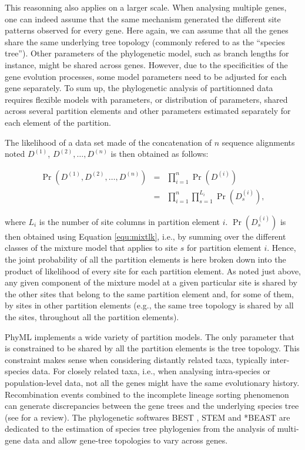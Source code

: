 \documentclass[a4paper,12pt]{article}
\begin{document}
This reasonning  also applies on a  larger scale. When  analysing multiple genes, one  can indeed
assume that the same  mechanism generated the different site patterns observed  for every gene. Here
again, we can assume that all the genes share the same underlying tree topology (commonly refered to
as the ``species  tree'').  Other parameters of  the phylogenetic model, such as  branch lengths for
instance, might  be shared across  genes. However,  due to the  specificities of the  gene evolution
processes, some  model parameters  need to be  adjusted for  each gene separately.   To sum  up, the
phylogenetic analysis of partitionned data requires flexible models with parameters, or distribution
of parameters,  shared across several partition  elements and other parameters  estimated separately
for each element of the partition.

The likelihood of a  data set made of the concatenation of $n$  sequence alignments noted $D^{(1)}$,
$D^{(2)}, \ldots, D^{(n)}$ is then obtained as follows:

\begin{eqnarray*}
\Pr(D^{(1)},D^{(2)},\ldots,D^{(n)}) &=& \prod_{i=1}^{n}  \Pr(D^{(i)}) \\
&=& \prod_{i=1}^{n}  \prod_{s=1}^{L_i} \Pr(D^{(i)}_s),
\end{eqnarray*} 

where $L_i$ is the number of site columns in partition element $i$.  $\Pr(D^{(i)}_s)$
is then obtained using Equation \ref{equ:mixtlk}, i.e., by summing over the different classes of the
mixture model that  applies to site $s$ for  partition element $i$. Hence, the  joint probability of
all the partition elements is here broken down into the product of likelihood of every site for each
partition  element. As  noted just  above,  any given  component of  the  mixture model  at a  given
particular site is shared by the other sites that belong to the same partition element and, for some
of them, by  sites in other partition  elements (e.g., the same  tree topology is shared  by all the
sites, throughout all the partition elements).

PhyML implements a wide  variety of partition models.  The only parameter that  is constrained to be
shared  by all  the  partition elements  is  the tree  topology. This  constraint  makes sense  when
considering distantly  related taxa, typically inter-species  data. For closely related  taxa, i.e.,
when  analysing intra-species  or population-level  data,  not all  the  genes might  have the  same
evolutionary history.   Recombination events combined  to the incomplete lineage  sorting phenomenon
can  generate  discrepancies   between  the  gene  trees  and  the   underlying  species  tree  (see
\cite{degnan09}  for  a review).   The  phylogenetic  softwares BEST  \cite{best},  STEM
\cite{stem} and  *BEAST \cite{startbeast} are dedicated  to the estimation
of species tree phylogenies  from the analysis of multi-gene data and  allow gene-tree topologies to
vary across genes.
\end{document}
